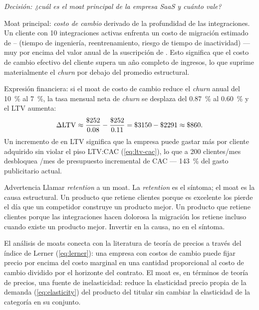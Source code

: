 \begin{example}
\emph{Decisión: ¿cuál es el moat principal de la empresa SaaS y cuánto vale?}

Moat principal: \emph{costo de cambio} derivado de la profundidad de las integraciones. Un
cliente con 10 integraciones activas enfrenta un costo de migración estimado de
-- (tiempo de ingeniería, reentrenamiento, riesgo de tiempo de
inactividad) --- muy por encima del valor anual de la suscripción de . Esto
significa que el costo de cambio efectivo del cliente supera un año completo de ingresos, lo
que suprime materialmente el \emph{churn} por debajo del promedio estructural.

Expresión financiera: si el moat de costo de cambio reduce el \emph{churn} anual del
\qty{10}{\percent} al \qty{7}{\percent}, la tasa mensual neta de \emph{churn} se desplaza
del \qty{0.87}{\percent} al \qty{0.60}{\percent} y el LTV aumenta:
\[
  \Delta\mathrm{LTV} \approx \frac{\$\num{252}}{0.08} - \frac{\$\num{252}}{0.11}
                           = \$\num{3150} - \$\num{2291} \approx \$\num{860}.
\]
Un incremento de  en LTV significa que la empresa puede gastar  más
por cliente adquirido sin violar el piso LTV:CAC (\cref{eq:ltv-cac}), lo que a 200
clientes/mes desbloquea /mes de presupuesto incremental de CAC ---
\qty{143}{\percent} del gasto publicitario actual.
\end{example}

\begin{admonition}{Advertencia}
Llamar \emph{retention} a un moat. La \emph{retention} es el síntoma; el moat es la causa
estructural. Un producto que retiene clientes porque es excelente los pierde el día que un
competidor construye un producto mejor. Un producto que retiene clientes porque las
integraciones hacen dolorosa la migración los retiene incluso cuando existe un producto
mejor. Invertir en la causa, no en el síntoma.
\end{admonition}

El análisis de moats conecta con la literatura de teoría de precios a través del índice de
Lerner (\cref{eq:lerner}): una empresa con costos de cambio puede fijar precio por encima
del costo marginal en una cantidad proporcional al costo de cambio dividido por el horizonte
del contrato. El moat es, en términos de teoría de precios, una fuente de inelasticidad:
reduce la elasticidad precio propia de la demanda (\cref{eq:elasticity}) del producto del
titular sin cambiar la elasticidad de la categoría en su conjunto.

